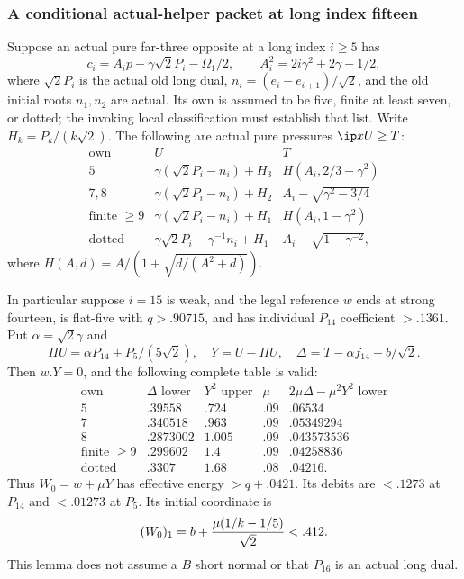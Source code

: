 \subsubsection{A conditional actual-helper packet at long index fifteen}
\begin{lemma}
\label{lem:I-helper15-pressure-packet}
Suppose an actual pure far-three opposite at a long index \(i\ge5\)
has
\[
 c_i=A_i p-\gamma\sqrt2P_i-\Omega_1/2,\qquad
 A_i^2=2i\gamma^2+2\gamma-1/2,
\]
where \(\sqrt2P_i\) is the actual old long dual,
\(n_i=(e_i-e_{i+1})/\sqrt2\), and the old initial roots
\(n_1,n_2\) are actual. Its own is assumed to be five, finite at
least seven, or dotted; the invoking local classification must establish
that list. Write \(H_k=P_k/(k\sqrt2)\).
The following are actual pure pressures \(\ip xU\ge T\):
\[
\begin{array}{c|c|c}
\text{own}&U&T\\ \hline
5&\gamma(\sqrt2P_i-n_i)+H_3&H(A_i,2/3-\gamma^2)\\
7,8&\gamma(\sqrt2P_i-n_i)+H_2&A_i-\sqrt{\gamma^2-3/4}\\
\text{finite }\ge9&\gamma(\sqrt2P_i-n_i)+H_1&H(A_i,1-\gamma^2)\\
\text{dotted}&\gamma\sqrt2P_i-\gamma^{-1}n_i+H_1&A_i-\sqrt{1-\gamma^{-2}},
\end{array}
\]
where \(H(A,d)=A/(1+\sqrt{d/(A^2+d)})\).

In particular suppose \(i=15\) is weak, and the legal reference \(w\)
ends at strong fourteen, is flat-five with \(q>.90715\), and has
individual \(P_{14}\) coefficient \(>.1361\).
Put \(\alpha=\sqrt2\gamma\) and
\[
 \Pi U=\alpha P_{14}+P_5/(5\sqrt2),\quad
 Y=U-\Pi U,\quad \Delta=T-\alpha f_{14}-b/\sqrt2.
\]
Then \(w.Y=0\), and the following complete table is valid:
\[
\begin{array}{c|c|c|c|c}
\text{own}&\Delta\text{ lower}&Y^2\text{ upper}&\mu&
 2\mu\Delta-\mu^2Y^2\text{ lower}\\ \hline
5&.39558&.724&.09&.06534\\
7&.340518&.963&.09&.05349294\\
8&.2873002&1.005&.09&.043573536\\
\text{finite }\ge9&.299602&1.4&.09&.04258836\\
\text{dotted}&.3307&1.68&.08&.04216 .
\end{array}
\]
Thus \(W_0=w+\mu Y\) has effective energy \(>q+.0421\).
Its debits are \(<.1273\) at \(P_{14}\) and \(<.01273\) at \(P_5\).
Its initial coordinate is
\[
 (W_0)_1=b+{\mu(1/k-1/5)\over\sqrt2}<.412.
\]
This lemma does not assume a \(B\) short normal or that \(P_{16}\)
is an actual long dual.
\end{lemma}
